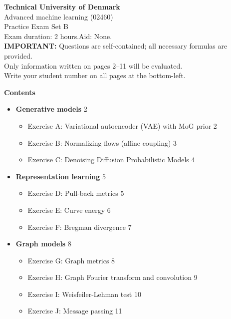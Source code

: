 \documentclass[12pt,a4paper]{article}
\begin{document}
\begin{center}
{\large\bfseries Technical University of Denmark}\\[4pt]
{\large Advanced machine learning (02460)}\\[4pt]
{\large Practice Exam Set B}\\[4pt]
Exam duration: 2 hours.\quad Aid: None.\\[2pt]
\textbf{IMPORTANT:} Questions are self-contained; all necessary formulas are provided.\\
Only information written on pages 2--11 will be evaluated.\\
Write your student number on all pages at the bottom-left.
\end{center}

\bigskip
\textbf{Contents}
\begin{itemize}[noitemsep]
  \item[\textbf{I}] \textbf{Generative models} \hfill 2
  \begin{itemize}[noitemsep]
    \item Exercise A: Variational autoencoder (VAE) with MoG prior \hfill 2
    \item Exercise B: Normalizing flows (affine coupling) \hfill 3
    \item Exercise C: Denoising Diffusion Probabilistic Models \hfill 4
  \end{itemize}
  \item[\textbf{II}] \textbf{Representation learning} \hfill 5
  \begin{itemize}[noitemsep]
    \item Exercise D: Pull-back metrics \hfill 5
    \item Exercise E: Curve energy \hfill 6
    \item Exercise F: Bregman divergence \hfill 7
  \end{itemize}
  \item[\textbf{III}] \textbf{Graph models} \hfill 8
  \begin{itemize}[noitemsep]
    \item Exercise G: Graph metrics \hfill 8
    \item Exercise H: Graph Fourier transform and convolution \hfill 9
    \item Exercise I: Weisfeiler-Lehman test \hfill 10
    \item Exercise J: Message passing \hfill 11
  \end{itemize}
\end{itemize}
\end{document}

